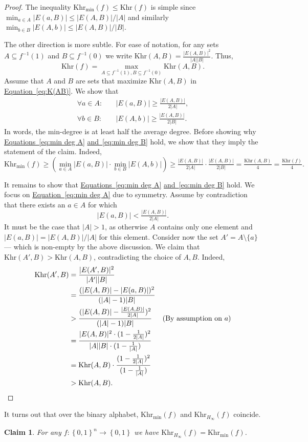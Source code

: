 \documentclass[11pt]{article}
\numberwithin{equation}{section}
\newtheorem{claim}[theorem]{Claim}
\theoremstyle{definition}
\theoremstyle{plain}
\newcommand{\expref}[2]{\hyperref[#2]{#1~\ref{#2}}}
\theoremstyle{definition}\newtheorem{notation}[theorem]{Notation}\theoremstyle{plain}
\newcommand{\B}{\left\{ 0,1 \right \}}
\newcommand{\Hm}{H_{\infty}}
\newcommand{\K}{\mathrm{Khr}}
\newcommand{\Km}{\K_{\Hm}}
\newcommand{\Kmin}{\K_{\min}}
\theoremstyle{definition}
\theoremstyle{plain}
\begin{document}
\begin{proof}
The inequality $\Kmin(f)\le\K(f)$ is simple since $\min_{a\in A}{|E(a,B)|}\le|E(A,B)|/|A|$
and similarly $\min_{b\in B}{|E(A,b)|}\le|E(A,B)|/|B|$.

The other direction is more subtle. For ease of notation, for any
sets $A\subseteq f^{-1}(1)$ and $B\subseteq f^{-1}(0)$ we 
%
write %
$\K(A,B)=\frac{|E(A,B)|^{2}}{|A||B|}$. Thus, 
\begin{equation}
\K(f)=\max_{A\subseteq f^{-1}(1),B\subseteq f^{-1}(0)}\K(A,B).\label{eq:K(AB)}
\end{equation}
Assume that $A$ and $B$ are sets that maximize $\K(A,B)$ in \expref{Equation}{eq:K(AB)}.
We show that 
\begin{align}
\forall{a\in A}\colon & \quad|E(a,B)|\ge\tfrac{|E(A,B)|}{2|A|},\label{eq:min deg A}\\
\forall{b\in B}\colon & \quad|E(A,b)|\ge\tfrac{|E(A,B)|}{2|B|}.\label{eq:min deg B}
\end{align}
In words, the min-degree is at least half the average degree. Before
showing why \expref{Equations}{eq:min deg A}
\expref{and}{eq:min deg B} hold, we show that they
imply the statement of the claim. Indeed, 
\[
\Kmin(f)\ge\left(\min_{a\in A}{|E(a,B)|}\cdot\min_{b\in B}{|E(A,b)|}\right)\ge\tfrac{|E(A,B)|}{2|A|}\cdot\tfrac{|E(A,B)|}{2|B|}=\tfrac{\K(A,B)}{4}=\tfrac{\K(f)}{4}.
\]

It remains to show that \expref{Equations}{eq:min deg A}
\expref{and}{eq:min deg B} hold. We
focus on \expref{Equation}{eq:min deg A} due to symmetry. Assume by contradiction
that there exists an $a\in A$ for which 
\[
|E(a,B)|<\tfrac{|E(A,B)|}{2|A|}.
\]
It must be the case that $|A|>1$, as otherwise $A$ contains only
one element and $|E(a,B)|=|E(A,B)|/|A|$ for this element. Consider
now the set $A'=A\setminus\{a\}$ --- which is non-empty by the above
discussion. We claim that $\K(A',B)>\K(A,B)$, contradicting the choice
of $A,B$. Indeed, 
\begin{align*}
\K(A',B) & =\frac{|E(A',B)|^{2}}{|A'||B|}\\
 & =\frac{(|E(A,B)|-|E(a,B)|)^{2}}{(|A|-1)|B|}\\
 & >\frac{(|E(A,B)|-\frac{|E(A,B)|}{2|A|})^{2}}{(|A|-1)|B|} & \text{(By assumption on \ensuremath{a})}\\
 & =\frac{|E(A,B)|^{2}\cdot(1-\frac{1}{2|A|})^{2}}{|A||B|\cdot(1-\frac{1}{|A|})}\\
 & =\K(A,B)\cdot\frac{(1-\frac{1}{2|A|})^{2}}{(1-\frac{1}{|A|})}\\
 & >\K(A,B). & \qedhere
\end{align*}
\end{proof}
It turns out that over the binary alphabet, $\Kmin(f)$ and $\Km(f)$
coincide. 
\begin{claim}
\label{claim:Km-Kmin} For any $f\colon\B^{n}\to\B$ we have $\Km(f)=\Kmin(f)$. 
\end{claim}
\end{document}
